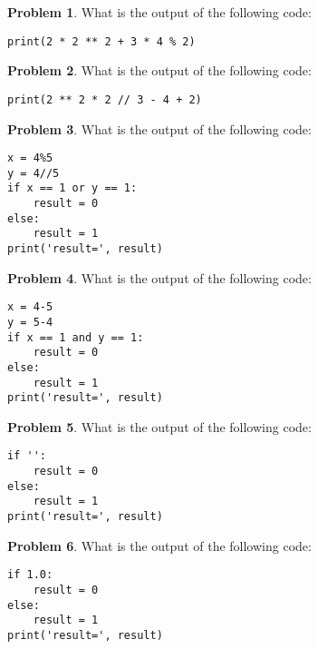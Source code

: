 \documentclass[10pt]{article}
\theoremstyle{definition}
\newtheorem{problem}{Problem}
\begin{document}
\begin{problem}
    What is the output of the following code:
\end{problem}
\begin{lstlisting}
print(2 * 2 ** 2 + 3 * 4 % 2)
\end{lstlisting}
\vspace{1.5in}

\begin{problem}
    What is the output of the following code:
\end{problem}
\begin{lstlisting}
print(2 ** 2 * 2 // 3 - 4 + 2)
\end{lstlisting}
\vspace{1.5in}

\begin{problem}
    What is the output of the following code:
\end{problem}
\begin{lstlisting}
x = 4%5
y = 4//5
if x == 1 or y == 1:
    result = 0
else:
    result = 1
print('result=', result)
\end{lstlisting}
\vspace{1.8in}

\begin{problem}
    What is the output of the following code:
\end{problem}
\begin{lstlisting}
x = 4-5
y = 5-4
if x == 1 and y == 1:
    result = 0
else:
    result = 1
print('result=', result)
\end{lstlisting}
\vspace{1.8in}

\begin{problem}
    What is the output of the following code:
\end{problem}
\begin{lstlisting}
if '':
    result = 0
else:
    result = 1
print('result=', result)
\end{lstlisting}
\vspace{1.8in}

\begin{problem}
    What is the output of the following code:
\end{problem}
\begin{lstlisting}
if 1.0:
    result = 0
else:
    result = 1
print('result=', result)
\end{lstlisting}
\vspace{1.8in}
\end{document}
